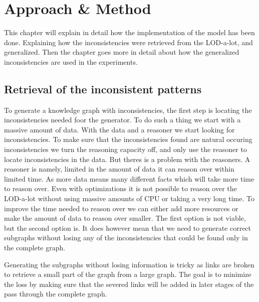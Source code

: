 \documentclass{article}
\begin{document}
\newpage
\section{Approach \& Method}
This chapter will explain in detail how the implementation of the model has been done. Explaining how the inconsistencies were retrieved from the LOD-a-lot, and generalized. Then the chapter goes more in detail about how the generalized inconsistencies are used in the experiments. 

\subsection{Retrieval of the inconsistent patterns}
To generate a knowledge graph with inconsistencies, the first step is locating the inconsistencies needed foor the generator. To do such a thing we start with a massive amount of data. With the data and a reasoner we start looking for inconsistencies. To make sure that the inconsistencies found are natural occuring inconsistencies we turn the reasoning capacity off, and only use the reasoner to locate inconsistencies in the data. But theres is a problem with the reasoners. A reasoner is namely,  limited in the amount of data it can reason over within limited time. As more data means many different facts which will take more time to reason over. Even with optimizations it is not possible to reason over the LOD-a-lot without using massive amounts of CPU or taking a very long time. To improve the time needed to reason over we can either add more resources or make the amount of data to reason over smaller. The first option is not viable, but the second option is. 
It does however mean that we need to generate correct subgraphs without losing any of the inconsistencies that could be found only in the complete graph.

Generating the subgraphs without losing information is tricky as links are broken to retrieve a small part of the graph from a large graph. The goal is to minimize the loss by making sure that the severed links will be added in later stages of the pass through the complete graph.
\end{document}
